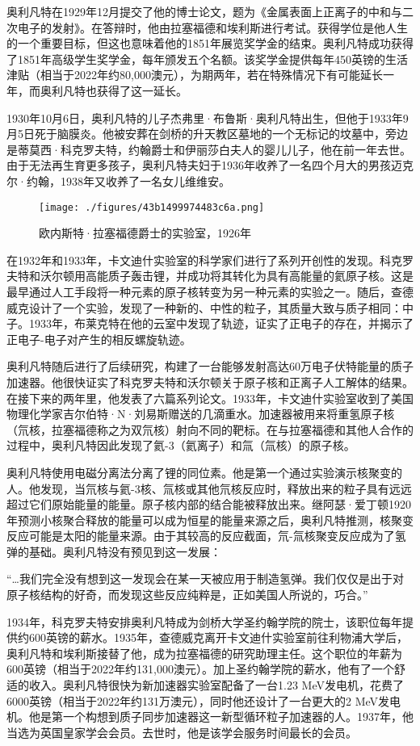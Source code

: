 奥利凡特在1929年12月提交了他的博士论文，题为《金属表面上正离子的中和与二次电子的发射》。在答辩时，他由拉塞福德和埃利斯进行考试。获得学位是他人生的一个重要目标，但这也意味着他的1851年展览奖学金的结束。奥利凡特成功获得了1851年高级学生奖学金，每年颁发五个名额。该奖学金提供每年450英镑的生活津贴（相当于2022年约80,000澳元），为期两年，若在特殊情况下有可能延长一年，而奥利凡特也获得了这一延长。

1930年10月6日，奥利凡特的儿子杰弗里·布鲁斯·奥利凡特出生，但他于1933年9月5日死于脑膜炎。他被安葬在剑桥的升天教区墓地的一个无标记的坟墓中，旁边是蒂莫西·科克罗夫特，约翰爵士和伊丽莎白夫人的婴儿儿子，他在前一年去世。由于无法再生育更多孩子，奥利凡特夫妇于1936年收养了一名四个月大的男孩迈克尔·约翰，1938年又收养了一名女儿维维安。
\begin{figure}[ht]
\centering
\texttt{[image: ./figures/43b1499974483c6a.png]}
\caption{欧内斯特·拉塞福德爵士的实验室，1926年} \label{fig_MKalft_3}
\end{figure}
在1932年和1933年，卡文迪什实验室的科学家们进行了系列开创性的发现。科克罗夫特和沃尔顿用高能质子轰击锂，并成功将其转化为具有高能量的氦原子核。这是最早通过人工手段将一种元素的原子核转变为另一种元素的实验之一。随后，查德威克设计了一个实验，发现了一种新的、中性的粒子，其质量大致与质子相同：中子。1933年，布莱克特在他的云室中发现了轨迹，证实了正电子的存在，并揭示了正电子-电子对产生的相反螺旋轨迹。

奥利凡特随后进行了后续研究，构建了一台能够发射高达60万电子伏特能量的质子加速器。他很快证实了科克罗夫特和沃尔顿关于原子核和正离子人工解体的结果。在接下来的两年里，他发表了六篇系列论文。1933年，卡文迪什实验室收到了美国物理化学家吉尔伯特·N·刘易斯赠送的几滴重水。加速器被用来将重氢原子核（氘核，拉塞福德称之为双氘核）射向不同的靶标。在与拉塞福德和其他人合作的过程中，奥利凡特因此发现了氦-3（氦离子）和氚（氚核）的原子核。

奥利凡特使用电磁分离法分离了锂的同位素。他是第一个通过实验演示核聚变的人。他发现，当氘核与氦-3核、氚核或其他氘核反应时，释放出来的粒子具有远远超过它们原始能量的能量。原子核内部的结合能被释放出来。继阿瑟·爱丁顿1920年预测小核聚合释放的能量可以成为恒星的能量来源之后，奥利凡特推测，核聚变反应可能是太阳的能量来源。由于其较高的反应截面，氘-氚核聚变反应成为了氢弹的基础。奥利凡特没有预见到这一发展：

“…我们完全没有想到这一发现会在某一天被应用于制造氢弹。我们仅仅是出于对原子核结构的好奇，而发现这些反应纯粹是，正如美国人所说的，巧合。”

1934年，科克罗夫特安排奥利凡特成为剑桥大学圣约翰学院的院士，该职位每年提供约600英镑的薪水。1935年，查德威克离开卡文迪什实验室前往利物浦大学后，奥利凡特和埃利斯接替了他，成为拉塞福德的研究助理主任。这个职位的年薪为600英镑（相当于2022年约131,000澳元）。加上圣约翰学院的薪水，他有了一个舒适的收入。奥利凡特很快为新加速器实验室配备了一台1.23 MeV发电机，花费了6000英镑（相当于2022年约131万澳元），同时他还设计了一台更大的2 MeV发电机。他是第一个构想到质子同步加速器这一新型循环粒子加速器的人。1937年，他当选为英国皇家学会会员。去世时，他是该学会服务时间最长的会员。
